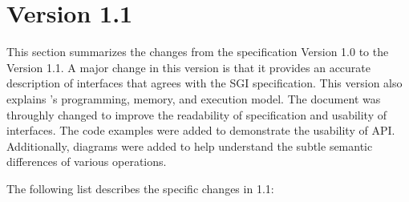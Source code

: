\section{Version 1.1}
This section summarizes the changes from the \openshmem specification Version 1.0 to the Version 1.1.  
A major change in this version is that it provides an accurate description of \openshmem interfaces that 
agrees with the SGI specification. This version also explains \openshmem’s programming, 
memory, and execution model. The document was throughly changed to improve the readability of specification 
and usability of interfaces. The code examples were added to demonstrate the usability of API. Additionally, diagrams 
were added to help understand the subtle semantic differences of various operations.


The following list describes the specific changes in 1.1:%

